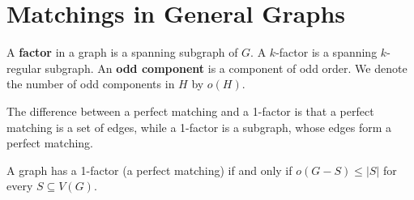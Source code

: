 \section{Matchings in General Graphs}%
\label{sec:3.3}

A \textbf{factor} in a graph is a spanning subgraph of $G$. A $k$-factor is a spanning $k$-regular subgraph. An \textbf{odd component} is a component of odd order. We denote the number of odd components in $H$ by $o(H)$.

The difference between a perfect matching and a 1-factor is that a perfect matching is a set of edges, while a 1-factor is a subgraph, whose edges form a perfect matching.

\begin{theorem}
	A graph has a 1-factor (a perfect matching) if and only if $o(G-S) \le |S|$ for every $S \subseteq V(G)$.
\end{theorem}

